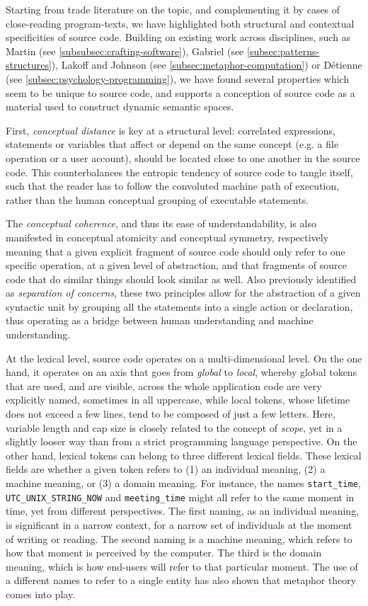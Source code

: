 Starting from trade literature on the topic, and complementing it by cases of close-reading program-texts, we have highlighted both structural and contextual specificities of source code. Building on existing work across disciplines, such as Martin (see \ref{subsubsec:crafting-software}), Gabriel (see \ref{subsec:patterns-structures}), Lakoff and Johnson (see \ref{subsec:metaphor-computation}) or Détienne (see \ref{subsec:psychology-programming}), we have found several properties which seem to be unique to source code, and supports a conception of source code as a material used to construct dynamic semantic spaces.

First, \emph{conceptual distance} is key at a structural level: correlated expressions, statements or variables that affect or depend on the same concept (e.g. a file operation or a user account), should be located close to one another in the source code. This counterbalances the entropic tendency of source code to tangle itself, such that the reader has to follow the convoluted machine path of execution, rather than the human conceptual grouping of executable statements.

The \emph{conceptual coherence}, and thus its ease of understandability, is also manifested in conceptual atomicity and conceptual symmetry, respectively meaning that a given explicit fragment of source code should only refer to one specific operation, at a given level of abstraction, and that fragments of source code that do similar things should look similar as well. Also previously identified as \emph{separation of concerns}, these two principles allow for the abstraction of a given syntactic unit by grouping all the statements into a single action or declaration, thus operating as a bridge between human understanding and machine understanding.

At the lexical level, source code operates on a multi-dimensional level. On the one hand, it operates on an axis that goes from \emph{global} to \emph{local}, whereby global tokens that are used, and are visible, across the whole application code are very explicitly named, sometimes in all uppercase, while local tokens, whose lifetime does not exceed a few lines, tend to be composed of just a few letters. Here, variable length and cap size is closely related to the concept of \emph{scope}, yet in a slightly looser way than from a strict programming language perspective. On the other hand, lexical tokens can belong to three different lexical fields. These lexical fields are whether a given token refers to (1) an individual meaning, (2) a machine meaning, or (3) a domain meaning. For instance, the names \lstinline{start_time}, \lstinline{UTC_UNIX_STRING_NOW} and \lstinline{meeting_time} might all refer to the same moment in time, yet from different perspectives. The first naming, as an individual meaning, is significant in a narrow context, for a narrow set of individuals at the moment of writing or reading. The second naming is a machine meaning, which refers to how that moment is perceived by the computer. The third is the domain meaning, which is how end-users will refer to that particular moment. The use of a different names to refer to a single entity has also shown that metaphor theory comes into play.

